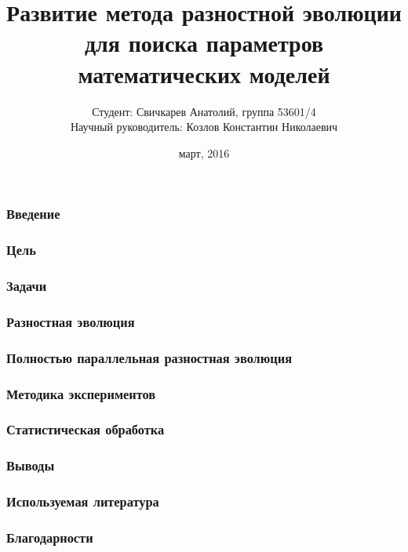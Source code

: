 \documentclass{beamer}
\begin{document}
\title[Развитие ППРЭ]
{Развитие метода разностной эволюции
для поиска параметров математических моделей}
\author[Свичкарев Анатолий]
{Студент: Свичкарев Анатолий, группа 53601/4\\
Научный руководитель: Козлов Константин Николаевич}
\date{март, 2016}

\frame{\titlepage} 


\begin{frame}
\frametitle{Введение}
\end{frame}

\begin{frame}
\frametitle{Цель}
\end{frame}

\begin{frame}
\frametitle{Задачи}
\end{frame}

\begin{frame}
\frametitle{Разностная эволюция}
\end{frame}

\begin{frame}
\frametitle{Полностью параллельная разностная эволюция}
\end{frame}

\begin{frame}
\frametitle{Методика экспериментов}
\end{frame}

\begin{frame}
\frametitle{Статистическая обработка}
\end{frame}

\begin{frame}
\frametitle{Выводы}
\end{frame}

\begin{frame}
\frametitle{Используемая литература}
\end{frame}

\begin{frame}
\frametitle{Благодарности}
\end{frame}
\end{document}
